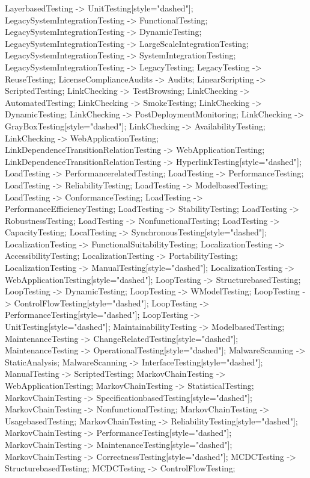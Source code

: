 \documentclass{article}
\begin{document}
{LayerbasedTesting -> UnitTesting[style="dashed"];
LegacySystemIntegrationTesting -> FunctionalTesting;
LegacySystemIntegrationTesting -> DynamicTesting;
LegacySystemIntegrationTesting -> LargeScaleIntegrationTesting;
LegacySystemIntegrationTesting -> SystemIntegrationTesting;
LegacySystemIntegrationTesting -> LegacyTesting;
LegacyTesting -> ReuseTesting;
LicenseComplianceAudits -> Audits;
LinearScripting -> ScriptedTesting;
LinkChecking -> TestBrowsing;
LinkChecking -> AutomatedTesting;
LinkChecking -> SmokeTesting;
LinkChecking -> DynamicTesting;
LinkChecking -> PostDeploymentMonitoring;
LinkChecking -> GrayBoxTesting[style="dashed"];
LinkChecking -> AvailabilityTesting;
LinkChecking -> WebApplicationTesting;
LinkDependenceTransitionRelationTesting -> WebApplicationTesting;
LinkDependenceTransitionRelationTesting -> HyperlinkTesting[style="dashed"];
LoadTesting -> PerformancerelatedTesting;
LoadTesting -> PerformanceTesting;
LoadTesting -> ReliabilityTesting;
LoadTesting -> ModelbasedTesting;
LoadTesting -> ConformanceTesting;
LoadTesting -> PerformanceEfficiencyTesting;
LoadTesting -> StabilityTesting;
LoadTesting -> RobustnessTesting;
LoadTesting -> NonfunctionalTesting;
LoadTesting -> CapacityTesting;
LocalTesting -> SynchronousTesting[style="dashed"];
LocalizationTesting -> FunctionalSuitabilityTesting;
LocalizationTesting -> AccessibilityTesting;
LocalizationTesting -> PortabilityTesting;
LocalizationTesting -> ManualTesting[style="dashed"];
LocalizationTesting -> WebApplicationTesting[style="dashed"];
LoopTesting -> StructurebasedTesting;
LoopTesting -> DynamicTesting;
LoopTesting -> WModelTesting;
LoopTesting -> ControlFlowTesting[style="dashed"];
LoopTesting -> PerformanceTesting[style="dashed"];
LoopTesting -> UnitTesting[style="dashed"];
MaintainabilityTesting -> ModelbasedTesting;
MaintenanceTesting -> ChangeRelatedTesting[style="dashed"];
MaintenanceTesting -> OperationalTesting[style="dashed"];
MalwareScanning -> StaticAnalysis;
MalwareScanning -> InterfaceTesting[style="dashed"];
ManualTesting -> ScriptedTesting;
MarkovChainTesting -> WebApplicationTesting;
MarkovChainTesting -> StatisticalTesting;
MarkovChainTesting -> SpecificationbasedTesting[style="dashed"];
MarkovChainTesting -> NonfunctionalTesting;
MarkovChainTesting -> UsagebasedTesting;
MarkovChainTesting -> ReliabilityTesting[style="dashed"];
MarkovChainTesting -> PerformanceTesting[style="dashed"];
MarkovChainTesting -> MaintenanceTesting[style="dashed"];
MarkovChainTesting -> CorrectnessTesting[style="dashed"];
MCDCTesting -> StructurebasedTesting;
MCDCTesting -> ControlFlowTesting;
}
\end{document}
